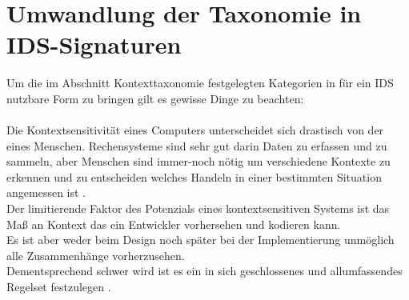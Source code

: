 	

\section{Umwandlung der Taxonomie in IDS-Signaturen} 

Um die im Abschnitt Kontexttaxonomie festgelegten Kategorien in für ein IDS nutzbare Form zu bringen gilt es gewisse Dinge zu beachten:\\\\ Die Kontextsensitivität eines Computers unterscheidet sich drastisch von der eines Menschen. Rechensysteme sind sehr gut darin Daten zu erfassen und zu sammeln, aber Menschen sind immer-noch nötig um verschiedene Kontexte zu erkennen und zu entscheiden welches Handeln in einer bestimmten Situation angemessen ist \cite{dey_understanding_2001}.\\
Der limitierende Faktor des Potenzials eines kontextsensitiven Systems ist das Maß an Kontext das ein Entwickler vorhersehen und kodieren kann.\\
Es ist aber weder beim Design noch später bei der Implementierung unmöglich alle Zusammenhänge vorherzusehen.\\
Dementsprechend schwer wird ist es ein in sich geschlossenes und allumfassendes Regelset festzulegen \cite{perera_context_2014}.\\\\

